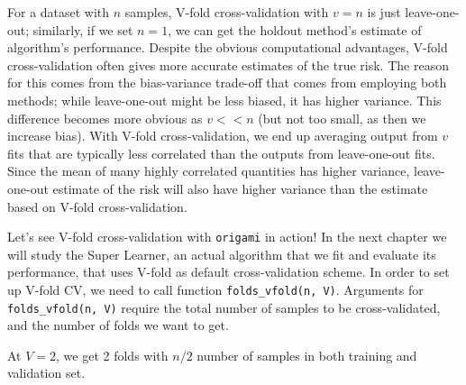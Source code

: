 \documentclass[12pt, krantz2,]{krantz}
\newenvironment{Shaded}{\begin{snugshade}}{\end{snugshade}}
\newcommand{\CommentTok}[1]{\textcolor[rgb]{0.37,0.37,0.37}{\textit{#1}}}
\newcommand{\DataTypeTok}[1]{\textcolor[rgb]{0.27,0.27,0.27}{#1}}
\newcommand{\DecValTok}[1]{\textcolor[rgb]{0.06,0.06,0.06}{#1}}
\newcommand{\KeywordTok}[1]{\textcolor[rgb]{0.27,0.27,0.27}{\textbf{#1}}}
\newcommand{\NormalTok}[1]{#1}
\newcommand{\StringTok}[1]{\textcolor[rgb]{0.5,0.5,0.5}{#1}}
\theoremstyle{definition}
\theoremstyle{definition}
\theoremstyle{definition}
\newcommand{\1}{\mathbbm{1}}
\begin{document}
For a dataset with \(n\) samples, V-fold cross-validation with \(v=n\) is just
leave-one-out; similarly, if we set \(n=1\), we can get the holdout method's
estimate of algorithm's performance. Despite the obvious computational
advantages, V-fold cross-validation often gives more accurate estimates of the
true risk. The reason for this comes from the bias-variance trade-off that comes
from employing both methods; while leave-one-out might be less biased, it has
higher variance. This difference becomes more obvious as \(v<<n\) (but not too
small, as then we increase bias). With V-fold cross-validation, we end up
averaging output from \(v\) fits that are typically less correlated than the
outputs from leave-one-out fits. Since the mean of many highly correlated
quantities has higher variance, leave-one-out estimate of the risk will also
have higher variance than the estimate based on V-fold cross-validation.

Let's see V-fold cross-validation with \texttt{origami} in action! In the next chapter
we will study the Super Learner, an actual algorithm that we fit and evaluate
its performance, that uses V-fold as default cross-validation scheme. In order
to set up V-fold CV, we need to call function \texttt{folds\_vfold(n,\ V)}. Arguments
for \texttt{folds\_vfold(n,\ V)} require the total number of samples to be
cross-validated, and the number of folds we want to get.

At \(V=2\), we get 2 folds with \(n/2\) number of samples in both training and
validation set.

\begin{Shaded}
\end{Shaded}
\end{document}
